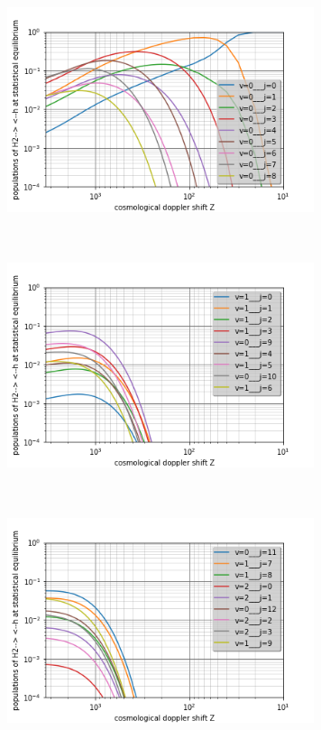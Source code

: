 \documentclass[10pt, a4paper]{report}
\numberwithin{equation}{subsection}
\begin{document}
\begin{figure}[]

\begin{subfigure}{0.5\textwidth}
\centering
\includegraphics[width=9cm,height=7cm]{levelsh2-h.0.png}
\end{subfigure}
\begin{subfigure}{0.5\textwidth}
\centering
\includegraphics[width=9cm,height=7cm]{levelsh2-h.1.png}
\end{subfigure}
\begin{subfigure}{0.5\textwidth}
\centering
\includegraphics[width=9cm,height=7cm]{levelsh2-h.2.png}

\end{subfigure}
\end{figure}
\end{document}

